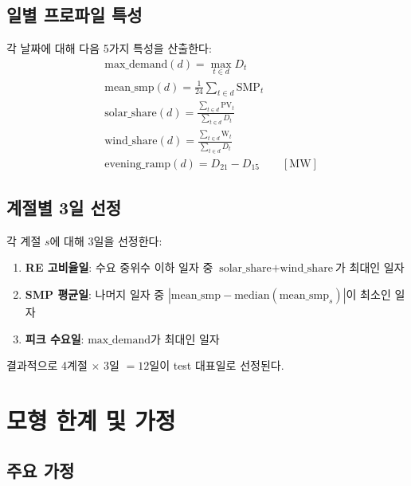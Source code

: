 \documentclass[11pt, a4paper]{article}
\begin{document}
\subsection{일별 프로파일 특성}

각 날짜에 대해 다음 5가지 특성을 산출한다:
\begin{align}
    &\text{max\_demand}(d) = \max_{t \in d} D_t \\
    &\text{mean\_smp}(d) = \frac{1}{24}\sum_{t \in d} \text{SMP}_t \\
    &\text{solar\_share}(d) = \frac{\sum_{t \in d} \text{PV}_t}{\sum_{t \in d} D_t} \\
    &\text{wind\_share}(d) = \frac{\sum_{t \in d} \text{W}_t}{\sum_{t \in d} D_t} \\
    &\text{evening\_ramp}(d) = D_{21} - D_{15} \qquad [\text{MW}]
\end{align}

\subsection{계절별 3일 선정}

각 계절 $s$에 대해 3일을 선정한다:
\begin{enumerate}[noitemsep]
    \item \textbf{RE 고비율일}: 수요 중위수 이하 일자 중 $\text{solar\_share} + \text{wind\_share}$가 최대인 일자
    \item \textbf{SMP 평균일}: 나머지 일자 중 $|\text{mean\_smp} - \text{median}(\text{mean\_smp}_s)|$이 최소인 일자
    \item \textbf{피크 수요일}: $\text{max\_demand}$가 최대인 일자
\end{enumerate}
결과적으로 4계절 $\times$ 3일 $= 12$일이 test 대표일로 선정된다.


\section{모형 한계 및 가정}\label{sec:limitations}

\subsection{주요 가정}
\end{document}
